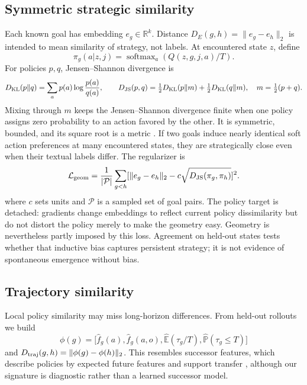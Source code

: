 \documentclass[11pt]{article}
\newcommand{\E}{\mathbb E}
\newcommand{\Prob}{\mathbb P}
\newcommand{\R}{\mathbb R}
\newcommand{\softmax}{\operatorname{softmax}}
\newcommand{\JS}{D_{\mathrm{JS}}}
\begin{document}
\subsection{Symmetric strategic similarity}

Each known goal has embedding $e_g\in\R^k$. Distance
$D_E(g,h)=\|e_g-e_h\|_2$ is intended to mean similarity of strategy, not labels.
At encountered state $z$, define
\begin{equation}
 \pi_g(a|z,j)=\softmax_a(Q(z,g,j,a)/T). \label{eq:policy}
\end{equation}
For policies $p,q$, Jensen--Shannon divergence is
\begin{equation}
 D_{\rm KL}(p\|q)=\sum_a p(a)\log\frac{p(a)}{q(a)},\qquad
 \JS(p,q)=\tfrac12D_{\rm KL}(p\|m)+\tfrac12D_{\rm KL}(q\|m),
 \quad m=\tfrac12(p+q).
\end{equation}
Mixing through $m$ keeps the Jensen--Shannon divergence finite when one policy
assigns zero probability to an action favored by the other. It is symmetric,
bounded, and its square root is a metric \cite{endres2003}. If two goals induce
nearly identical soft action preferences at many encountered states, they are
strategically close even when their textual labels differ. The regularizer is
\begin{equation}
 \mathcal L_{\rm geom}=\frac1{|\mathcal P|}\sum_{g<h}
 [\|e_g-e_h\|_2-c\sqrt{\JS(\pi_g,\pi_h)}]^2. \label{eq:geoloss}
\end{equation}
where $c$ sets units and $\mathcal P$ is a sampled set of goal pairs. The policy
target is detached: gradients change embeddings to reflect current policy
dissimilarity but do not distort the policy merely to make the geometry easy.
Geometry is nevertheless partly imposed by this loss. Agreement on held-out
states tests whether that inductive bias captures persistent strategy; it is
not evidence of spontaneous emergence without bias.

\subsection{Trajectory similarity}

Local policy similarity may miss long-horizon differences. From held-out
rollouts we build
\begin{equation}
 \phi(g)=\bigl[\widehat f_g(a),\widehat f_g(a,o),
 \widehat{\E}(\tau_g/T),\widehat{\Prob}(\tau_g\leq T)\bigr]
 \label{eq:trajectory-signature}
\end{equation}
and $D_{\rm traj}(g,h)=\|\phi(g)-\phi(h)\|_2$. This resembles successor
features, which describe policies by expected future features and support
transfer \cite{barreto2017}, although our signature is diagnostic rather than a
learned successor model.
\end{document}
